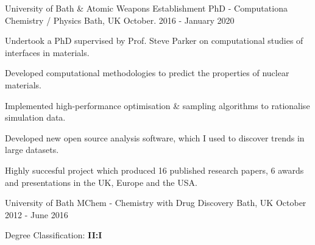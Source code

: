 \begin{cventries}
  \cventry
    {University of Bath \& Atomic Weapons Establishment}
    {PhD - Computationa Chemistry / Physics}
    {Bath, UK}
    {October. 2016 - January 2020}
    {
      \begin{cvitems}
        \item {Undertook a PhD supervised by Prof. Steve Parker on computational studies of interfaces in materials.}
        \item {Developed computational methodologies to predict the properties of nuclear materials.}
        \item {Implemented high-performance optimisation \& sampling algorithms to rationalise simulation data.}
        \item {Developed new open source analysis software, which I used to discover trends in large datasets.}
        \item {Highly succesful project which produced 16 published research papers, 6 awards and presentations in the UK, Europe and the USA.}
      \end{cvitems}
    }
\end{cventries}

\begin{cventries}
  \cventry
    {University of Bath}
    {MChem - Chemistry with Drug Discovery}
    {Bath, UK}
    {October 2012 - June 2016}
    {
      \begin{cvitems}
        \item {Degree Classification: \textbf{II:I}}
      \end{cvitems}
    }
\end{cventries}
